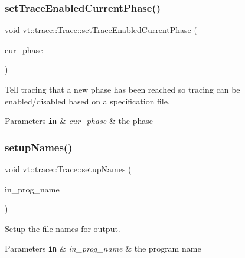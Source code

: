 \subsubsection{\texorpdfstring{set\+Trace\+Enabled\+Current\+Phase()}{setTraceEnabledCurrentPhase()}}
{\footnotesize\ttfamily void vt\+::trace\+::\+Trace\+::set\+Trace\+Enabled\+Current\+Phase (\begin{DoxyParamCaption}\item[{\hyperlink{namespacevt_a46ce6733d5cdbd735d561b7b4029f6d7}{Phase\+Type}}]{cur\+\_\+phase }\end{DoxyParamCaption})}



Tell tracing that a new phase has been reached so tracing can be enabled/disabled based on a specification file. 


\begin{DoxyParams}[1]{Parameters}
\mbox{\tt in}  & {\em cur\+\_\+phase} & the phase \\
\hline
\end{DoxyParams}
\mbox{\label{structvt_1_1trace_1_1_trace_a52cc4e12a7159cf21d8893b961834af8}} 
\subsubsection{\texorpdfstring{setup\+Names()}{setupNames()}}
{\footnotesize\ttfamily void vt\+::trace\+::\+Trace\+::setup\+Names (\begin{DoxyParamCaption}\item[{std\+::string const \&}]{in\+\_\+prog\+\_\+name }\end{DoxyParamCaption})}



Setup the file names for output. 


\begin{DoxyParams}[1]{Parameters}
\mbox{\tt in}  & {\em in\+\_\+prog\+\_\+name} & the program name \\
\hline
\end{DoxyParams}
\mbox{\label{structvt_1_1trace_1_1_trace_a5dd8767d9020ebeaba49ea3a684738a1}} 
